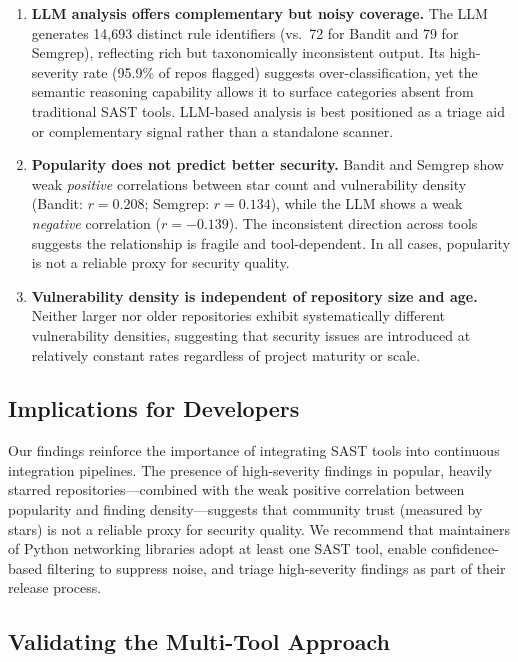 \documentclass[sigconf,authordraft]{acmart}
\begin{document}
\begin{enumerate}
  \item \textbf{LLM analysis offers complementary but noisy coverage.}
    The LLM generates 14{,}693 distinct rule identifiers (vs.\ 72 for
    Bandit and 79 for Semgrep), reflecting rich but taxonomically
    inconsistent output. Its high-severity rate (95.9\% of repos flagged)
    suggests over-classification, yet the semantic reasoning capability
    allows it to surface categories absent from traditional SAST tools.
    LLM-based analysis is best positioned as a triage aid or
    complementary signal rather than a standalone scanner.

  \item \textbf{Popularity does not predict better security.}
    Bandit and Semgrep show weak \emph{positive} correlations between
    star count and vulnerability density (Bandit: $r = 0.208$; Semgrep:
    $r = 0.134$), while the LLM shows a weak \emph{negative} correlation
    ($r = -0.139$). The inconsistent direction across tools suggests the
    relationship is fragile and tool-dependent. In all cases, popularity
    is not a reliable proxy for security quality.

  \item \textbf{Vulnerability density is independent of repository
    size and age.} Neither larger nor older repositories exhibit
    systematically different vulnerability densities, suggesting that
    security issues are introduced at relatively constant rates
    regardless of project maturity or scale.
\end{enumerate}

\subsection{Implications for Developers}

Our findings reinforce the importance of integrating SAST tools into
continuous integration pipelines. The presence of high-severity
findings in popular, heavily starred repositories---combined with the
weak positive correlation between popularity and finding
density---suggests that community trust (measured by stars) is not a
reliable proxy for security quality. We recommend that maintainers of
Python networking libraries adopt at least one SAST tool, enable
confidence-based filtering to suppress noise, and triage high-severity
findings as part of their release process.

\subsection{Validating the Multi-Tool Approach}
\end{document}
